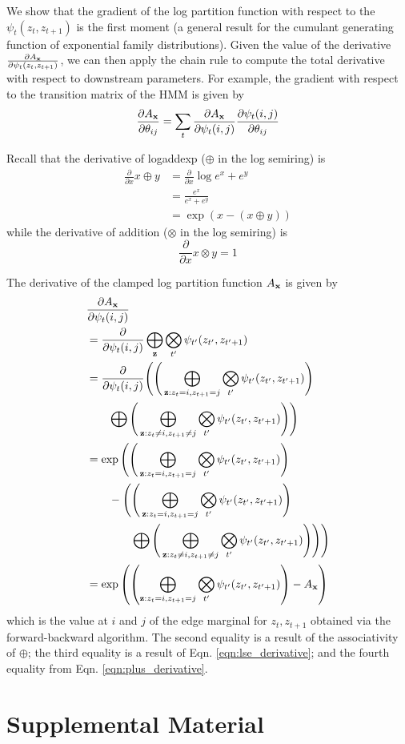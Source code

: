 \documentclass[11pt,a4paper]{article}
\begin{document}
We show that the gradient of the log partition function with respect to the $\psi_t(z_t, z_{t+1})$
is the first moment (a general result for the cumulant generating function
of exponential family distributions). Given the value of the derivative
$\frac{\partial A_{\mathbf{x}}}{\partial \psi_t(z_t, z_{t+1})}$,
we can then apply the chain rule to compute the total derivative with respect to
downstream parameters. For example, the gradient with respect to the transition matrix
of the HMM is given by
$$\frac{\partial A_{\mathbf{x}}}{\partial \theta_{ij}}
= \sum_t \frac{\partial A_{\mathbf{x}}}{\partial \psi_t(i,j)}
\frac{\partial \psi_t(i,j)}{\partial \theta_{ij}}$$

Recall that the derivative of logaddexp ($\oplus$ in the log semiring) is
\begin{equation}
\label{eqn:lse_derivative}
\begin{aligned}
\frac{\partial}{\partial x} x \oplus y
&= \frac{\partial}{\partial x} \log e^x + e^ y\\
&= \frac{e^x}{e^x + e^y}\\
&= \exp(x - (x \oplus y))
\end{aligned}
\end{equation}
while the derivative of addition ($\otimes$ in the log semiring) is
\begin{equation}
\label{eqn:plus_derivative}
\frac{\partial}{\partial x} x \otimes y = 1
\end{equation}

The derivative of the clamped log partition function $A_{\mathbf{x}}$ is given by
\begin{align*}
&\frac{\partial A_{\mathbf{x}}}{\partial \psi_t(i,j)}\\
&= \frac{\partial}{\partial \psi_t(i,j)} \bigoplus_{\mathbf{z}}
    \bigotimes_{t'} \psi_{t'}(z_{t'}, z_{t'+1})\\
&= \frac{\partial}{\partial \psi_t(i,j)} \Bigg(
        \Bigg(\bigoplus_{\mathbf{z}:z_t = i, z_{t+1} = j}
        \bigotimes_{t'} \psi_{t'}(z_{t'}, z_{t'+1})\Bigg)\\
& \qquad \bigoplus
        \Bigg(\bigoplus_{\mathbf{z}:z_t \ne i, z_{t+1} \ne j}
        \bigotimes_{t'} \psi_{t'}(z_{t'}, z_{t'+1})\Bigg)
    \Bigg)\\
&= \exp\Bigg(\Bigg(\bigoplus_{\mathbf{z}:z_t = i, z_{t+1} = j} 
    \bigotimes_{t'} \psi_{t'}(z_{t'}, z_{t'+1})\Bigg)\\
&\qquad - \Bigg(\Bigg(\bigoplus_{\mathbf{z}:z_t = i, z_{t+1} = j}
        \bigotimes_{t'} \psi_{t'}(z_{t'}, z_{t'+1})\Bigg)\\
    &\qquad \qquad \bigoplus
        \Bigg(\bigoplus_{\mathbf{z}:z_t \ne i, z_{t+1} \ne j}
        \bigotimes_{t'} \psi_{t'}(z_{t'}, z_{t'+1})\Bigg)
    \Bigg)\Bigg)\\
&= \exp\left(\left(\bigoplus_{\mathbf{z}:z_t = i, z_{t+1} = j} 
    \bigotimes_{t'} \psi_{t'}(z_{t'}, z_{t'+1})\right)
    - A_{\mathbf{x}}\right)
\end{align*} 
which is the value at $i$ and $j$ of the
edge marginal for $z_t, z_{t+1}$ obtained via the forward-backward algorithm.
The second equality is a result of the associativity of $\oplus$;
the third equality is a result of Eqn. \ref{eqn:lse_derivative};
and the fourth equality from Eqn. \ref{eqn:plus_derivative}.


\section{Supplemental Material}
\label{sec:supplemental}
\end{document}
